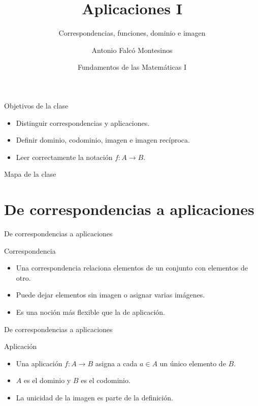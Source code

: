 \documentclass[aspectratio=169,11pt]{beamer}
\title[FdM I -- Clase 08]{Aplicaciones I}
\subtitle{Correspondencias, funciones, dominio e imagen}
\author{Antonio Falcó Montesinos}
\institute{Universidad CEU Cardenal Herrera}
\date{Fundamentos de las Matemáticas I}
\begin{document}
\begin{frame}
  \titlepage
\end{frame}

\begin{frame}{Objetivos de la clase}
\begin{itemize}
  \item Distinguir correspondencias y aplicaciones.
  \item Definir dominio, codominio, imagen e imagen recíproca.
  \item Leer correctamente la notación \(f:A\to B\).
\end{itemize}
\end{frame}

\begin{frame}{Mapa de la clase}
\tableofcontents
\end{frame}

\section{De correspondencias a aplicaciones}

\begin{frame}{De correspondencias a aplicaciones}
\begin{block}{Correspondencia}
\begin{itemize}
  \item Una correspondencia relaciona elementos de un conjunto con elementos de otro.
  \item Puede dejar elementos sin imagen o asignar varias imágenes.
  \item Es una noción más flexible que la de aplicación.
\end{itemize}
\end{block}
\end{frame}

\begin{frame}{De correspondencias a aplicaciones}
\begin{block}{Aplicación}
\begin{itemize}
  \item Una aplicación \(f:A\to B\) asigna a cada \(a\in A\) un único elemento de \(B\).
  \item \(A\) es el dominio y \(B\) es el codominio.
  \item La unicidad de la imagen es parte de la definición.
\end{itemize}
\end{block}
\end{frame}
\end{document}
